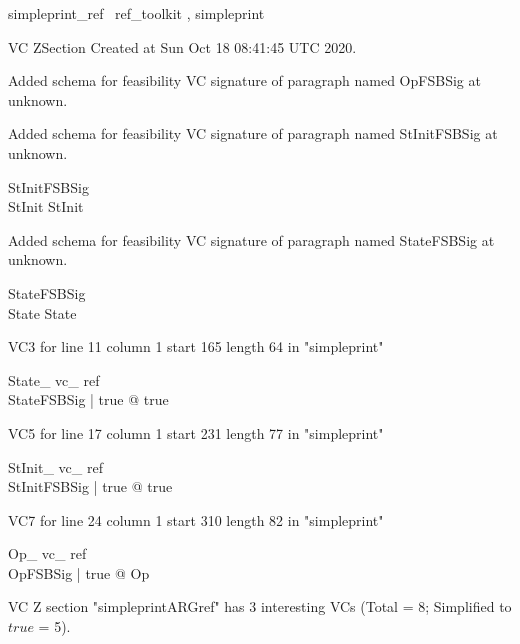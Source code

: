 \documentclass{article}
\begin{document}

\begin{zsection}	 \SECTION simpleprint\_ref \parents~ref\_toolkit , simpleprint
\end{zsection}

VC ZSection Created at Sun Oct 18 08:41:45 UTC 2020.


Added schema for feasibility VC signature of paragraph named OpFSBSig at unknown.


Added schema for feasibility VC signature of paragraph named StInitFSBSig at unknown.
\begin{schema}{StInitFSBSig}
\\
 StInit 
\where
 StInit
\end{schema}


Added schema for feasibility VC signature of paragraph named StateFSBSig at unknown.
\begin{schema}{StateFSBSig}
\\
 State 
\where
 State
\end{schema}

VC3 for line 11 column 1 start 165 length 64 in "simpleprint"
\begin{theorem}{ State\_ vc\_ ref}\\
 \exists StateFSBSig | true @ true \\

\end{theorem}

VC5 for line 17 column 1 start 231 length 77 in "simpleprint"
\begin{theorem}{ StInit\_ vc\_ ref}\\
 \exists StInitFSBSig | true @ true \\

\end{theorem}

VC7 for line 24 column 1 start 310 length 82 in "simpleprint"
\begin{theorem}{ Op\_ vc\_ ref}\\
 \forall OpFSBSig | true @ \pre Op \\

\end{theorem}



 VC Z section "simpleprintARGref" has $3$ interesting VCs (Total = 8; Simplified to $true$ = 5).



\end{document}
